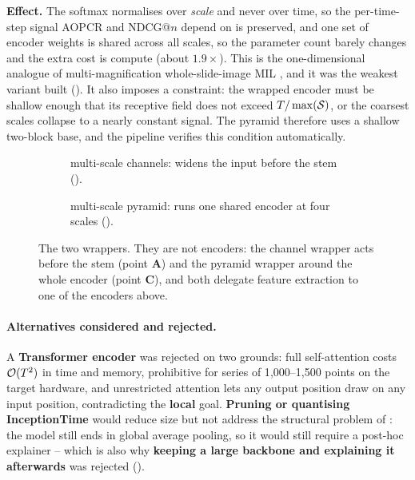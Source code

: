 \textbf{Effect.} The softmax normalises over \emph{scale} and never over time, so the per-time-step
signal AOPCR and NDCG@$n$ depend on is preserved, and one set of encoder weights is shared across
all scales, so the parameter count barely changes and the extra cost is compute (about $1.9\times$).
This is the one-dimensional analogue of multi-magnification whole-slide-image MIL
\citep{hashimoto2020msdamil}, and it was the weakest variant built (). It
also imposes a constraint: the wrapped encoder must be shallow enough that its receptive field does
not exceed $T / \max(\mathcal{S})$, or the coarsest scales collapse to a nearly constant
signal. The pyramid therefore uses a shallow two-block base, and the pipeline verifies this condition
automatically.

\begin{figure}[htbp]
  \centering
  \begin{subfigure}[t]{0.49\linewidth}
    \centering
    
    \caption{\seanet{} multi-scale channels: widens the input before the stem
    ().}
    \label{fig:var_mschan}
  \end{subfigure}\hfill
  \begin{subfigure}[t]{0.49\linewidth}
    \centering
    
    \caption{\seanet{} multi-scale pyramid: runs one shared encoder at four scales
    ().}
    \label{fig:var_pyramid}
  \end{subfigure}
  \caption{The two \seanet{} wrappers. They are not encoders: the channel wrapper acts before the
  stem (point \textbf{A}) and the pyramid wrapper around the whole encoder (point \textbf{C}), and
  both delegate feature extraction to one of the encoders above.}
  \label{fig:var_wrappers}
\end{figure}

\paragraph{Alternatives considered and rejected.}
A \textbf{Transformer encoder} was rejected on two grounds: full self-attention costs
$\mathcal{O}(T^2)$ in time and memory, prohibitive for series of 1{,}000--1{,}500 points on
the target hardware, and unrestricted attention lets any output position draw on any input position,
contradicting the \textbf{local} goal. \textbf{Pruning or quantising InceptionTime} would reduce
size but not address
the structural problem of : the model still ends in global average pooling, so it
would still require a post-hoc explainer -- which is also why \textbf{keeping a large backbone and
explaining it afterwards} was rejected ().

